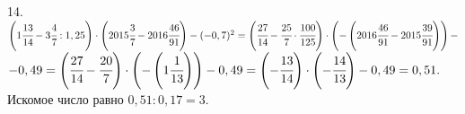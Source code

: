 14. $\left(1\cfrac{13}{14}-3\cfrac{4}{7}:1,25\right)\cdot\left(2015\cfrac{3}{7}-2016\cfrac{46}{91}\right)-
(-0,7)^2=\left(\cfrac{27}{14}-\cfrac{25}{7}\cdot\cfrac{100}{125}\right)\cdot\left(-\left(2016\cfrac{46}{91}-2015\cfrac{39}{91}\right)\right)-$\\
$-0,49=\left(\cfrac{27}{14}-\cfrac{20}{7}\right)\cdot\left(-\left(1\cfrac{1}{13}\right)\right)-
0,49=\left(-\cfrac{13}{14}\right)\cdot\left(-\cfrac{14}{13}\right)-0,49=0,51.$ Искомое число равно $0,51:0,17=3.$\\
